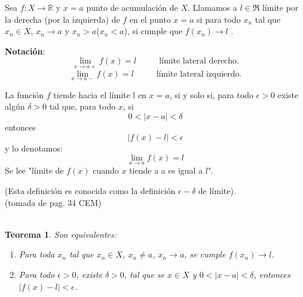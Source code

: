\documentclass[10pt,twoside]{SelfArx} %
\begin{document}
\begin{thm}
	Sea $ f:X\rightarrow\mathbb{R} $ y $ x=a $ punto de \textsf{acumulación de $ X $}. Llamamos a $ l\in\Re $ límite por la derecha (por la izquierda) de $ f $ en el punto $ x=a $ si para todo $ {x_{n}} $ tal que $ x_{n}\in X $, $ x_{n}\rightarrow a $ y $ x_{n}>a $($ x_{n}<a $), si cumple que $ f(x_{n})\rightarrow l $ .
\end{thm}
\textbf{Notación}:\\
\[ \lim\limits_{x\rightarrow a+}f(x)=l\;\;\;\;\;\;\;\;\;\ \mbox{límite lateral derecho}.\]
\[ \lim\limits_{x\rightarrow a-}f(x)=l\;\;\;\;\;\;\;\;\;\ \mbox{límite lateral izquierdo}.\]



\begin{thm}
	\label{limite}

La funci\'on $ f $ tiende hacia el l\'imite l en $ x=a $, si y solo si, para todo $ \epsilon>0 $ existe alg\'un $ \delta>0 $ tal que, para todo $ x $, si  \[ 0<|x-a|<\delta \] 
 entonces
   \[ |f(x)-l|<\epsilon  \]
    y lo denotamos:\\

\[   \lim\limits_{x\rightarrow a}f(x)=l   \]
Se lee "l\'imite de $ f(x) $ cuando $ x $ tiende a a es igual a $ l $".\\
\end{thm}
(Esta definici\'on es conocida como la definici\'on $ \epsilon-\delta $ de l\'imite).\\
(tomada de pag. 34 CEM)	\\
\\
\newtheorem{teorema}{Teorema}
\begin{teorema}\label{Teorema_equivalencia-entre_definiciones_limite}
	Son equivalentes:\\
	\begin{enumerate}
		\item [(a)]	Para toda $ {x_{n}} $ tal que $ x_{n}\in X $, $ x_{n}\neq a $, $ x_{n}\rightarrow a $, se cumple $ f(x_{n})\rightarrow l $.
		
		
		\item [(b)]	Para todo $ \epsilon>0 $, existe $ \delta>0 $, tal que se $ x\in X $ y $ 0<|x-a|<\delta $, entonces $ |f(x)-l|<\epsilon $.
		
		
	\end{enumerate}
\end{teorema}	
\end{document}
